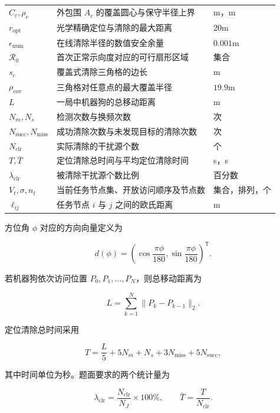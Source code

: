 {\begin{longtable}{@{}>{\small}p{}>{\small}p{}>{\small}p{}@{}}
$C_c,\rho_c$ & 外包围 $A_c$ 的覆盖圆心与保守半径上界 & m，m \\
$r_{\mathrm{opt}}$ & 光学精确定位与清除的最大距离 & $20\mathrm{m}$ \\
$\epsilon_{\mathrm{num}}$ & 在线清除半径的数值安全余量 & $0.001\mathrm{m}$ \\
$\mathcal R_0$ & 首次正常示向度对应的可行扇形区域 & 集合 \\
$s_c$ & 覆盖式清除三角格的边长 & m \\
$\rho_{\mathrm{cov}}$ & 三角格对任意点的最大覆盖半径 & $19.9\mathrm{m}$ \\
$L$ & 一局中机器狗的总移动距离 & m \\
$N_m,N_s$ & 检测次数与换频次数 & 次 \\
$N_{\mathrm{succ}},N_{\mathrm{miss}}$ & 成功清除次数与未发现目标的清除次数 & 次 \\
$N_{\mathrm{clr}}$ & 实际清除的干扰源个数 & 个 \\
$T,\bar T$ & 定位清除总时间与平均定位清除时间 & s，s \\
$\lambda_{\mathrm{clr}}$ & 被清除干扰源个数比例 & 百分数 \\
$V_t,\sigma,n_t$ & 当前任务节点集、开放访问顺序及节点数 & 集合，排列，个 \\
$\ell_{ij}$ & 任务节点 $i$ 与 $j$ 之间的欧氏距离 & m \\
\bottomrule
\end{longtable}}

方位角 $\phi$ 对应的方向向量定义为

\begin{equation}
d(\phi)=
\left(
\cos\frac{\pi\phi}{180},
\sin\frac{\pi\phi}{180}
\right)^{\mathsf T}.
\label{eq:q4_direction}
\end{equation}

若机器狗依次访问位置 $P_0,P_1,\ldots,P_N$，则总移动距离为

\begin{equation}
L=\sum_{k=1}^{N}\lVert P_k-P_{k-1}\rVert_2.
\label{eq:q4_distance}
\end{equation}

定位清除总时间采用

\begin{equation}
T=\frac{L}{5}+5N_m+N_s+3N_{\mathrm{miss}}+5N_{\mathrm{succ}},
\label{eq:q4_total_time}
\end{equation}

其中时间单位为秒。题面要求的两个统计量为

\begin{equation}
\lambda_{\mathrm{clr}}=\frac{N_{\mathrm{clr}}}{N_J}\times100\%,
\qquad
\bar T=\frac{T}{N_{\mathrm{clr}}}.
\label{eq:q4_metrics}
\end{equation}

